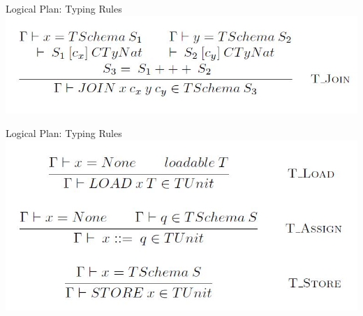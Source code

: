 \begin{frame}{Logical Plan: Typing Rules}
\centering
\includegraphics[scale=0.4]{Images/TypingRules/Join.JPG}
\end{frame}

\begin{frame}{Logical Plan: Typing Rules}
\centering
\includegraphics[scale=0.4]{Images/TypingRules/Load_Assign_Store.JPG}
\end{frame}

